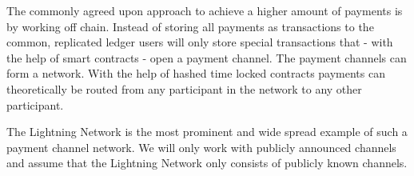 \documentclass[a4paper]{paper}
\begin{document}
The commonly agreed upon approach to achieve a higher amount of payments is by working off chain.
Instead of storing all payments as transactions to the common, replicated ledger users will only store special transactions that - with the help of smart contracts - open a payment channel.
The payment channels can form a network.
With the help of hashed time locked contracts payments can theoretically be routed from any participant in the network to any other participant. 

The Lightning Network is the most prominent and wide spread example of such a payment channel network.
We will only work with publicly announced channels and assume that the Lightning Network only consists of publicly known channels.

\null\newpage
\null\newpage
\begin{minipage}[t]{0.8\linewidth}
  
\end{minipage}
\end{document}
